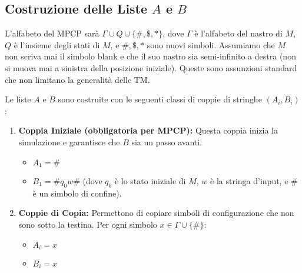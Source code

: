 \documentclass[a4paper]{article}
\theoremstyle{definition} %
\theoremstyle{remark} %
\begin{document}
\subsection{Costruzione delle Liste $A$ e $B$}
L'alfabeto del MPCP sarà $\Gamma \cup Q \cup \{\#, \$, *\}$, dove $\Gamma$ è l'alfabeto del nastro di $M$, $Q$ è l'insieme degli stati di $M$, e $\#, \$, *$ sono nuovi simboli.
Assumiamo che $M$ non scriva mai il simbolo blank e che il suo nastro sia semi-infinito a destra (non si muova mai a sinistra della posizione iniziale). Queste sono assunzioni standard che non limitano la generalità delle TM.

Le liste $A$ e $B$ sono costruite con le seguenti classi di coppie di stringhe $(A_i, B_i)$:

\begin{enumerate}
    \item \textbf{Coppia Iniziale (obbligatoria per MPCP):}
    Questa coppia inizia la simulazione e garantisce che $B$ sia un passo avanti.
    \begin{itemize}
        \item $A_1 = \#$
        \item $B_1 = \# q_0 w \#$ (dove $q_0$ è lo stato iniziale di $M$, $w$ è la stringa d'input, e $\#$ è un simbolo di confine).
    \end{itemize}

    \item \textbf{Coppie di Copia:}
    Permettono di copiare simboli di configurazione che non sono sotto la testina.
    Per ogni simbolo $x \in \Gamma \cup \{\#\}$:
    \begin{itemize}
        \item $A_i = x$
        \item $B_i = x$
    \end{itemize}


\end{enumerate}
\end{document}
